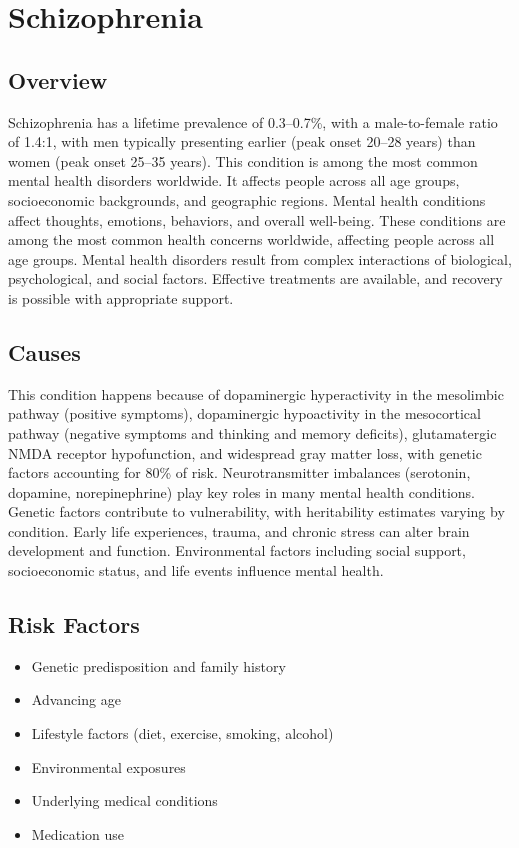 \chapter{Schizophrenia}
\label{sec:Schizophrenia}

\section{Overview}
Schizophrenia has a lifetime prevalence of 0.3--0.7\%, with a male-to-female ratio of 1.4:1, with men typically presenting earlier (peak onset 20--28 years) than women (peak onset 25--35 years). This condition is among the most common mental health disorders worldwide. It affects people across all age groups, socioeconomic backgrounds, and geographic regions. Mental health conditions affect thoughts, emotions, behaviors, and overall well-being. These conditions are among the most common health concerns worldwide, affecting people across all age groups. Mental health disorders result from complex interactions of biological, psychological, and social factors. Effective treatments are available, and recovery is possible with appropriate support.
\section{Causes}
This condition happens because of dopaminergic hyperactivity in the mesolimbic pathway (positive symptoms), dopaminergic hypoactivity in the mesocortical pathway (negative symptoms and thinking and memory deficits), glutamatergic NMDA receptor hypofunction, and widespread gray matter loss, with genetic factors accounting for 80\% of risk.  Neurotransmitter imbalances (serotonin, dopamine, norepinephrine) play key roles in many mental health conditions. Genetic factors contribute to vulnerability, with heritability estimates varying by condition. Early life experiences, trauma, and chronic stress can alter brain development and function. Environmental factors including social support, socioeconomic status, and life events influence mental health.   
\section{Risk Factors}
\begin{itemize}[noitemsep]
  \item Genetic predisposition and family history
  \item Advancing age
  \item Lifestyle factors (diet, exercise, smoking, alcohol)
  \item Environmental exposures
  \item Underlying medical conditions
  \item Medication use
\end{itemize}
